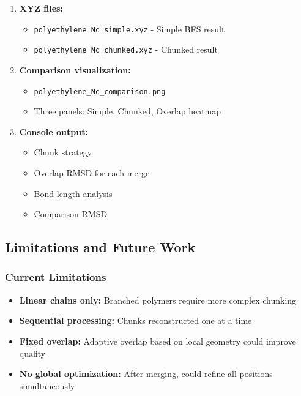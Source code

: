 \documentclass[11pt,a4paper]{article}
\begin{document}
\begin{enumerate}
    \item \textbf{XYZ files:}
    \begin{itemize}
        \item \texttt{polyethylene\_Nc\_simple.xyz} - Simple BFS result
        \item \texttt{polyethylene\_Nc\_chunked.xyz} - Chunked result
    \end{itemize}

    \item \textbf{Comparison visualization:}
    \begin{itemize}
        \item \texttt{polyethylene\_Nc\_comparison.png}
        \item Three panels: Simple, Chunked, Overlap heatmap
    \end{itemize}

    \item \textbf{Console output:}
    \begin{itemize}
        \item Chunk strategy
        \item Overlap RMSD for each merge
        \item Bond length analysis
        \item Comparison RMSD
    \end{itemize}
\end{enumerate}

\subsection{Limitations and Future Work}

\subsubsection{Current Limitations}

\begin{itemize}
    \item \textbf{Linear chains only:} Branched polymers require more complex chunking
    \item \textbf{Sequential processing:} Chunks reconstructed one at a time
    \item \textbf{Fixed overlap:} Adaptive overlap based on local geometry could improve quality
    \item \textbf{No global optimization:} After merging, could refine all positions simultaneously
\end{itemize}
\end{document}
